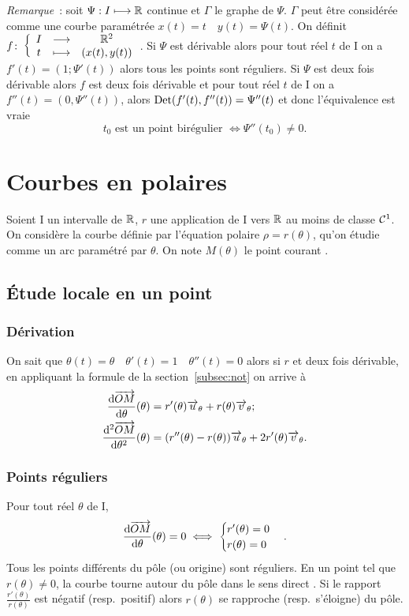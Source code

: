 \emph{Remarque}~:
soit $\Psi : I \longmapsto \mathbb{R}$ continue et $\Gamma$ le graphe de $\Psi$. $\Gamma$ peut être considérée comme une courbe paramétrée $x(t)=t \quad y(t)=\Psi(t)$. On définit $f\colon \left\{\begin{array}{ccc} I & \longrightarrow &\mathbb{R}^2\\ t & \longmapsto & (x(t),y(t)) \end{array} \right.$. Si $\Psi$ est dérivable alors pour tout réel $t$ de I on a $f'(t)=(1;\Psi'(t))$ alors tous les points sont réguliers. Si $\Psi$ est deux fois dérivable alors $f$ est deux fois dérivable et pour tout réel $t$ de I on a $f''(t)=(0,\Psi''(t))$, alors $\operatorname{Det}(f'(t),f''(t))=\Psi''(t)$ et donc l'équivalence est vraie
\begin{equation}
 t_0 \text{~est un point birégulier } \iff \Psi''(t_0) \neq 0.
\end{equation}

\section{Courbes en polaires}
Soient I un intervalle de $\mathbb{R}$, $r$ une application de I vers $\mathbb{R}$ au moins de classe $\mathcal{C}^{1}$. On considère la courbe définie par l'équation polaire $\rho=r(\theta)$, qu'on étudie comme un arc paramétré par $\theta$. On note $M(\theta)$ le point \og courant \fg{}.

\subsection{Étude locale en un point}
\subsubsection{Dérivation}
On sait que $\theta(t)=\theta \quad \theta'(t)=1 \quad \theta''(t)=0$ alors si $r$ et deux fois dérivable, en appliquant la formule de la section~\ref{subsec:not} on arrive à
\begin{align}
 \dfrac{\mathrm{d} \overrightarrow{OM}}{\mathrm{d} \theta}(\theta)&=r'(\theta) \overrightarrow{u}_\theta + r(\theta) \overrightarrow{v}_\theta;\\
 \dfrac{\mathrm{d}^2 \overrightarrow{OM}}{\mathrm{d} {\theta}^2}(\theta)&=(r''(\theta)-r(\theta)) \overrightarrow{u}_\theta + 2r'(\theta) \overrightarrow{v}_\theta.
\end{align}

\subsubsection{Points réguliers}
Pour tout réel $\theta$ de I,
\begin{equation}
 \dfrac{\mathrm{d} \overrightarrow{OM}}{\mathrm{d} \theta}(\theta)=0 \iff
 \begin{cases}
   r'(\theta) = 0 \\ r(\theta)=0
 \end{cases}.
\end{equation}
Tous les points différents du pôle (ou origine) sont réguliers. En un point tel que $r(\theta) \neq 0$, la courbe \og tourne autour du pôle dans le sens direct \fg{}. Si le rapport $\frac{r'(\theta)}{r(\theta)}$ est négatif (resp.\ positif) alors $r(\theta)$ se rapproche (resp.\ s'éloigne) du pôle.

